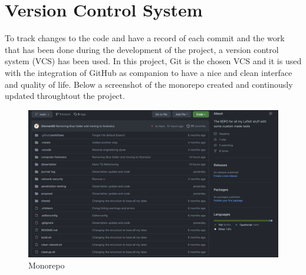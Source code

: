 \section{Version Control System}
\label{s:Version-Control-System}
To track changes to the code and have a record of each commit and the work that
has been done during the development of the project, a version control system (VCS)
has been used. In this project, Git is the chosen VCS and it is used with the
integration of GitHub as companion to have a nice and clean interface and
quality of life. Below a screenshot of the monorepo created and continously updated
throughtout the project.

\begin{figure}[H]
  \centering
  \includegraphics[width=1\textwidth]{figures/monorepo}
  \caption{Monorepo}
  \label{f:monorepo}
\end{figure}
